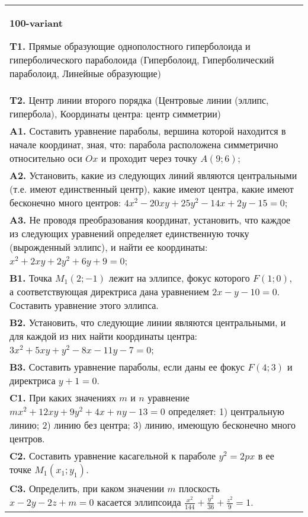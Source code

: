 \documentclass{article}
\begin{document}
\begin{tabular}{m{17cm}}
\textbf{100-variant}
\newline

\textbf{T1.} Прямые образующие однополостного гиперболоида и гиперболического параболоида (Гиперболоид, Гиперболический параболоид, Линейные образующие) \\
\textbf{T2.} Центр линии второго порядка (Центровые линии (эллипс, гипербола), Координаты центра: центр симметрии) \\
\textbf{A1.} Составить уравнение параболы, вершина которой находится в начале координат, зная, что: парабола расположена симметрично относительно оси $O x$ и проходит через точку $A(9 ; 6)$; \\
\textbf{A2.} Установить, какие из следующих линий являются центральными (т.е. имеют единственный центр), какие имеют центра, какие имеют бесконечно много центров: $4 x^2-20 x y+25 y^2-14 x+2 y-15=0$; \\
\textbf{A3.} Не проводя преобразования координат, установить, что каждое из следующих уравнений определяет единственную точку (вырожденный эллипс), и найти ее координаты: $x^2+2 x y+2 y^2+6 y+9=0$; \\
\textbf{B1.} Точка $M_1(2 ;-1)$ лежит на эллипсе, фокус которого $F(1 ; 0)$, а соответствующая директриса дана уравнением $2 x-y-10=0$. Составить уравнение этого эллипса. \\
\textbf{B2.} Установить, что следующие линии являются центральными, и для каждой из них найти координаты центра: $3 x^2+5 x y+y^2-8 x-11 y-7=0$; \\
\textbf{B3.} Составить уравнение параболы, если даны ее фокус $F(4 ; 3)$ и директриса $y+1=0$. \\
\textbf{C1.} При каких значениях $m$ и $n$ уравнение $m x^2+12 x y+9 y^2+4 x+n y-13=0$ определяет: 1) центральную линию; 2) линию без центра; 3) линию, имеющую бесконечно много центров. \\
\textbf{C2.} Составить уравнение касагельной к параболе $y^2=2 p x$ в ее точке $M_1\left(x_1 ; y_1\right)$. \\
\textbf{C3.} Определить, при каком значении $m$ плоскость $x-2 y-2 z+m=0$ касается эллипсоида $\frac{x^2}{144}+\frac{y^2}{36}+\frac{z^2}{9}=1$. \\

\end{tabular}
\vspace{1cm}
\end{document}
